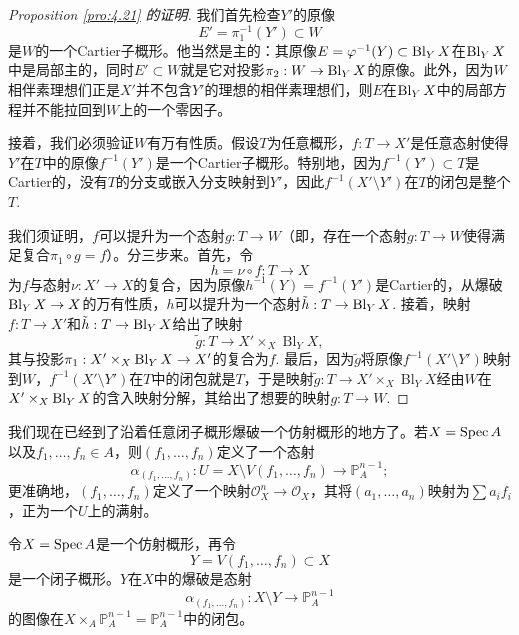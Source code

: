\begin{proof}[Proposition \ref{pro:4.21} 的证明]
	我们首先检查$Y'$的原像
	\[
		E'=\pi_1^{-1}(Y')\subset W
	\]
	是$W$的一个Cartier子概形。他当然是主的：其原像$E=\varphi^{-1}(Y)\subset \operatorname{Bl}_Y X$在$\operatorname{Bl}_Y X$中是局部主的，同时$E'\subset W$就是它对投影$\pi_2:W\to \operatorname{Bl}_Y X$的原像。此外，因为$W$相伴素理想们正是$X'$并不包含$Y'$的理想的相伴素理想们，则$E$在$\operatorname{Bl}_Y X$中的局部方程并不能拉回到$W$上的一个零因子。

	接着，我们必须验证$W$有万有性质。假设$T$为任意概形，$f:T\to X'$是任意态射使得$Y'$在$T$中的原像$f^{-1}(Y')$是一个Cartier子概形。特别地，因为$f^{-1}(Y')\subset T$是Cartier的，没有$T$的分支或嵌入分支映射到$Y'$，因此$f^{-1}(X'\setminus Y')$在$T$的闭包是整个$T$.

	我们须证明，$f$可以提升为一个态射$g:T\to W$（即，存在一个态射$g:T\to W$使得满足复合$\pi_1\circ g=f$）。分三步来。首先，令
	\[
		h=\nu\circ f:T\to X
	\]
	为$f$与态射$\nu:X'\to X$的复合，因为原像$h^{-1}(Y)=f^{-1}(Y')$是Cartier的，从爆破$\operatorname{Bl}_Y X\to X$的万有性质，$h$可以提升为一个态射$\tilde h:T\to \operatorname{Bl}_Y X$.
	接着，映射$f:T\to X'$和$\tilde h:T\to \operatorname{Bl}_Y X$给出了映射
	\[
		\tilde g:T\to X'\times_X \operatorname{Bl}_Y X,
	\]
	其与投影$\pi_1:X'\times_X \operatorname{Bl}_Y X\to X'$的复合为$f$. 最后，因为$\tilde g$将原像$f^{-1}(X'\setminus Y')$映射到$W$，$f^{-1}(X'\setminus Y')$在$T$中的闭包就是$T$，于是映射$\tilde g:T\to X'\times_X \operatorname{Bl}_Y X$经由$W$在$X'\times_X \operatorname{Bl}_Y X$的含入映射分解，其给出了想要的映射$g:T\to W$.
\end{proof}

我们现在已经到了沿着任意闭子概形爆破一个仿射概形的地方了。若$X=\operatorname{Spec} A$以及$f_1,\dots,f_n\in A$，则$(f_1,\dots,f_n)$定义了一个态射
\[
	\alpha_{(f_1,\dots,f_n)}:U=X\setminus V(f_1,\dots,f_n)\longrightarrow \mathbb P_A^{n-1};
\]
更准确地，$(f_1,\dots,f_n)$定义了一个映射$\mathscr O_X^n\to \mathscr O_X$，其将$(a_1,\dots,a_n)$映射为$\sum a_if_i$，正为一个$U$上的满射。

\begin{pro}\label{pro:4.22}
令$X=\operatorname{Spec} A$是一个仿射概形，再令
\[
	Y=V(f_1,\dots,f_n)\subset X
\]
是一个闭子概形。$Y$在$X$中的爆破是态射
\[
	\alpha_{(f_1,\dots,f_n)}:X\setminus Y\longrightarrow \mathbb P_A^{n-1}
\]
的图像在$X\times_A \mathbb P_A^{n-1}=\mathbb P_A^{n-1}$中的闭包。
\end{pro}


